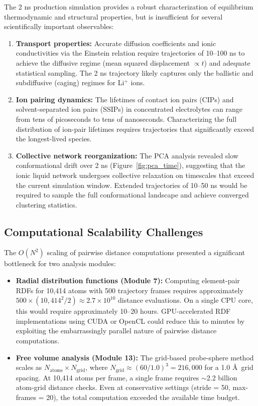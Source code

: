 \documentclass[twocolumn,10pt]{article}
\begin{document}
The 2 ns production simulation provides a robust characterization of equilibrium thermodynamic and structural properties, but is insufficient for several scientifically important observables:

\begin{enumerate}[nosep]
    \item \textbf{Transport properties:} Accurate diffusion coefficients and ionic conductivities via the Einstein relation require trajectories of 10--100 ns to achieve the diffusive regime (mean squared displacement $\propto t$) and adequate statistical sampling. The 2 ns trajectory likely captures only the ballistic and subdiffusive (caging) regimes for Li$^+$ ions.
    \item \textbf{Ion pairing dynamics:} The lifetimes of contact ion pairs (CIPs) and solvent-separated ion pairs (SSIPs) in concentrated electrolytes can range from tens of picoseconds to tens of nanoseconds. Characterizing the full distribution of ion-pair lifetimes requires trajectories that significantly exceed the longest-lived species.
    \item \textbf{Collective network reorganization:} The PCA analysis revealed slow conformational drift over 2 ns (Figure~\ref{fig:pca_time}), suggesting that the ionic liquid network undergoes collective relaxation on timescales that exceed the current simulation window. Extended trajectories of 10--50 ns would be required to sample the full conformational landscape and achieve converged clustering statistics.
\end{enumerate}

\subsection{Computational Scalability Challenges}

The $O(N^2)$ scaling of pairwise distance computations presented a significant bottleneck for two analysis modules:

\begin{itemize}[nosep]
    \item \textbf{Radial distribution functions (Module 7):} Computing element-pair RDFs for 10,414 atoms with 500 trajectory frames requires approximately $500 \times (10{,}414^2 / 2) \approx 2.7 \times 10^{10}$ distance evaluations. On a single CPU core, this would require approximately 10--20 hours. GPU-accelerated RDF implementations using CUDA or OpenCL could reduce this to minutes by exploiting the embarrassingly parallel nature of pairwise distance computations.
    \item \textbf{Free volume analysis (Module 13):} The grid-based probe-sphere method scales as $N_{\text{atoms}} \times N_{\text{grid}}$, where $N_{\text{grid}} \approx (60/1.0)^3 = 216{,}000$ for a 1.0 \AA\ grid spacing. At 10,414 atoms per frame, a single frame requires $\sim$2.2 billion atom-grid distance checks. Even at conservative settings (stride = 50, max-frames = 20), the total computation exceeded the available time budget.
\end{itemize}
\end{document}
